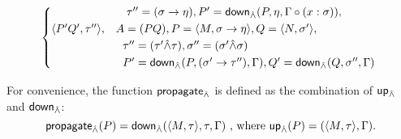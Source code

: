 \documentclass[main.tex]{subfiles}
\begin{document}
\begin{defn}
\[\begin{cases*}
                \phantom{} &\phantom{, } $\tau'' = (\sigma \tot \eta), P' = \mcf{down}_{\unify}(P, \eta, \Gamma \circ (x : \sigma)),$ \\
            \ttt{P' Q'}{\tau''}
 ,& $A = (PQ), P = \ttt{M}{\sigma \tot \eta}, Q = \ttt{N}{\sigma'},$ \\
                \phantom{} &\phantom{, }$\tau'' = (\tau' \unify \tau), \sigma'' = (\sigma' \unify \sigma)$ \\
                \phantom{} &\phantom{, }$P' = \mcf{down}_{\unify}(P, (\sigma' \tot \tau''), \Gamma),
                Q' = \mcf{down}_{\unify}(Q, \sigma'', \Gamma)$ \\
        \end{cases*}
    \]

    For convenience, the function $\mathsf{propagate}_{\hat{\wedge}}$ is defined as the combination
    of $\mathsf{up}_{\hat{\wedge}}$ and $\mathsf{down}_{\hat{\wedge}}$:
    \[
        \mathsf{propagate}_{\hat{\wedge}}(P) = \mathsf{down}_{\hat{\wedge}}(\langle M, \tau \rangle, \tau, \Gamma)
        \text{ , where } \mathsf{up}_{\hat{\wedge}}(P) = (\langle M, \tau \rangle, \Gamma).
    \]
  \end{defn}
  \newpage
\end{document}
